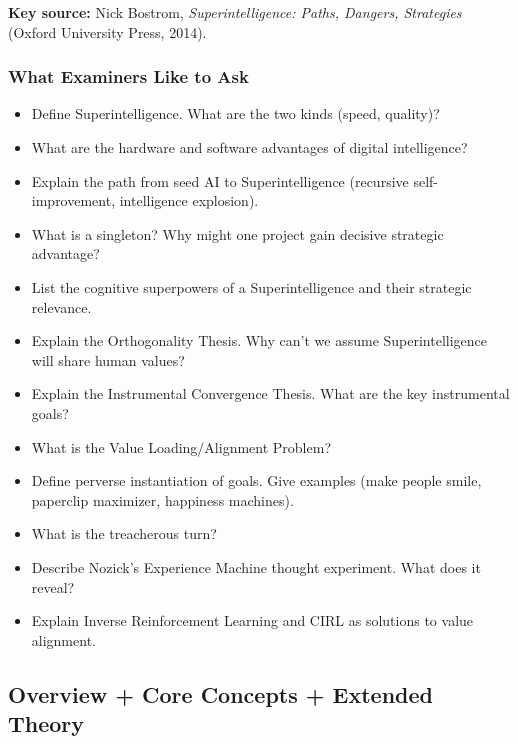 \textbf{Key source:} Nick Bostrom, \textit{Superintelligence: Paths, Dangers, Strategies} (Oxford University Press, 2014).

\separator

\subsubsection*{What Examiners Like to Ask}

\begin{itemize}
  \item Define Superintelligence. What are the two kinds (speed, quality)?
  \item What are the hardware and software advantages of digital intelligence?
  \item Explain the path from seed AI to Superintelligence (recursive self-improvement, intelligence explosion).
  \item What is a singleton? Why might one project gain decisive strategic advantage?
  \item List the cognitive superpowers of a Superintelligence and their strategic relevance.
  \item Explain the Orthogonality Thesis. Why can't we assume Superintelligence will share human values?
  \item Explain the Instrumental Convergence Thesis. What are the key instrumental goals?
  \item What is the Value Loading/Alignment Problem?
  \item Define perverse instantiation of goals. Give examples (make people smile, paperclip maximizer, happiness machines).
  \item What is the treacherous turn?
  \item Describe Nozick's Experience Machine thought experiment. What does it reveal?
  \item Explain Inverse Reinforcement Learning and CIRL as solutions to value alignment.
\end{itemize}

\bigseparator

\subsection{Overview + Core Concepts + Extended Theory}

